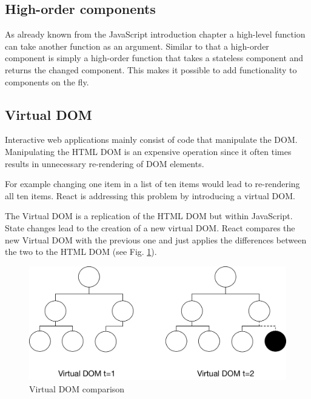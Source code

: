 \subsection{High-order components}

As already known from the JavaScript introduction chapter
a high-level function can take another function as an argument.
Similar to that a high-order component is simply a high-order function
that takes a stateless component and returns the changed component. 
This makes it possible to add functionality to components on the fly. 








\subsection{Virtual DOM}

Interactive web applications mainly consist of code that manipulate the DOM. 
Manipulating the HTML DOM is an expensive operation
since it often times results in unnecessary re-rendering of DOM elements. 

For example changing one item in a list of ten items would lead to re-rendering all ten items.
React is addressing this problem by introducing a virtual DOM. 

The Virtual DOM is a replication of the HTML DOM but within JavaScript.
State changes lead to the creation of a new virtual DOM. React compares the new Virtual DOM with the previous one 
and just applies the differences between the two to the HTML DOM  (see Fig. \ref{fig:VirtualDom}).

\begin{figure}[H]
	\centering
	\includegraphics[width=0.8\linewidth]{bilder/grundlagen/VirtualDom.png}
	\caption{Virtual DOM comparison}
	\label{fig:VirtualDom}
\end{figure}

